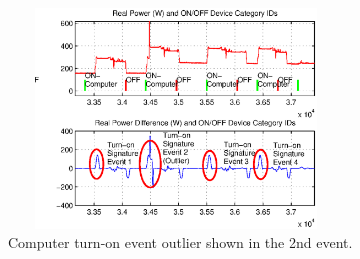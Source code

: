 \documentclass[conference]{IEEEtran}
\begin{document}
\begin{figure}[!t]
	\centering
	\includegraphics[height = 2.3in, width=3.5in]{fig/outlier.eps}
	\caption{Computer turn-on event outlier shown in the 2nd event.}
	\label{fig:outlier}
\end{figure}
%

%
%
\end{document}
